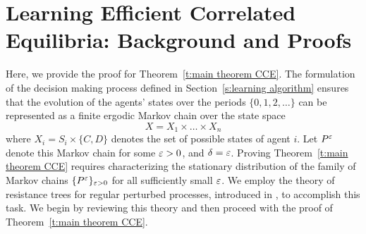 
\section{Learning Efficient Correlated Equilibria: Background and Proofs}\label{s:proof CCE}


Here, we provide the proof for Theorem~\ref{t:main theorem CCE}. The formulation of the decision making process defined in Section~\ref{s:learning algorithm} ensures that the evolution of the agents' states over the periods $\{0, 1, 2, \dots\}$ can be represented as a finite ergodic Markov chain over the state space
%
\begin{equation}
X = X_1 \times \dots \times X_n
\end{equation}
%
where $X_i = S_i\times \{C,D\}$ denotes the set of possible states of agent $i$.  Let $P^\varepsilon$ denote this Markov chain for some $\varepsilon > 0$, and $\delta = \varepsilon$.  Proving Theorem~\ref{t:main theorem CCE} requires characterizing the stationary distribution of the family of Markov chains $\{P^\varepsilon\}_{\varepsilon > 0}$ for all sufficiently small $\varepsilon$.  We employ the theory of resistance trees for regular perturbed processes, introduced in \cite{Young1993}, to accomplish this task.  We begin by reviewing this theory and then proceed with the proof of Theorem~\ref{t:main theorem CCE}.

